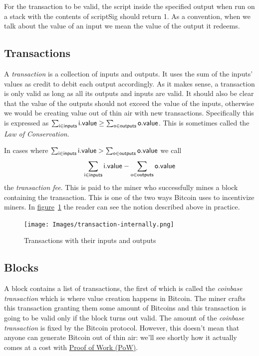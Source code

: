 For the transaction to be valid, the script inside the specified output when run on a stack with the contents of \textsf{scriptSig} should return 1. As a convention, when we talk about the value of an input we mean the value of the output it redeems.
%

\subsection{\label{sec:transactions}Transactions}
A \emph{transaction} is a collection of inputs and outputs. It uses the sum of the inputs' values as credit to debit each output accordingly. As it makes sense, a transaction is only valid as long as all its outputs and inputs are valid. It should also be clear that the value of the outputs should not exceed the value of the inputs, otherwise we would be creating value out of thin air with new transactions. Specifically this is expressed as $\sum_{\sf i \in inputs} {\sf i.value} \ge \sum_{\sf o \in outputs} {\sf o.value}$. This is sometimes called the \emph{Law of Conservation}.

In cases where $\sum_{\sf i \in inputs} {\sf i.value} > \sum_{\sf o \in outputs} {\sf o.value}$ we call
\begin{equation}
  \sum_{\sf i \in inputs} {\sf i.value} - \sum_{\sf o \in outputs} {\sf o.value}
\end{equation}
the \emph{transaction fee}. This is paid to the miner who successfully mines a block containing the transaction. This is one of the two ways Bitcoin uses to incentivize miners. In \hyperref[fig:transaction-internally]{figure}~\ref{fig:transaction-internally} the reader can see the notion described above in practice.

\begin{figure}[ht]
  \centering
  \texttt{[image: Images/transaction-internally.png]}
  \caption{Transactions with their inputs and outputs~\cite{mastering}}
  \label{fig:transaction-internally}
\end{figure}

\subsection{\label{sec:blocks}Blocks}
A block contains a list of transactions, the first of which is called the \emph{coinbase transaction} which is where value creation happens in Bitcoin. The miner crafts this transaction granting them some amount of Bitcoins and this transaction is going to be valid only if the block turns out valid. The amount of the \emph{coinbase transaction} is fixed by the Bitcoin protocol. However, this doesn't mean that anyone can generate Bitcoin out of thin air: we'll see shortly how it actually comes at a cost with \hyperref[proofOfWork]{Proof of Work (PoW)}.

